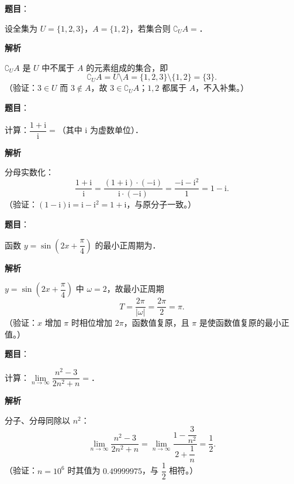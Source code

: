 \begin{answer}

\textbf{题目}：

设全集为 \(U=\{1,2,3\}\)，\(A=\{1,2\}\)，若集合则 \(\complement_{U}A=\)\gkblank{}．

\textbf{解析}

\(\complement_{U}A\) 是 \(U\) 中不属于 \(A\) 的元素组成的集合，即
\nopagebreak[4]
\[
\complement_{U}A=U\setminus A=\{1,2,3\}\setminus\{1,2\}=\{3\}.
\]
（验证：\(3\in U\) 而 \(3\notin A\)，故 \(3\in\complement_{U}A\)；\(1,2\) 都属于 \(A\)，不入补集。）


\end{answer}
\begin{answer}

\textbf{题目}：

计算：\(\dfrac{1+\mathrm{i}}{\mathrm{i}}=\)\gkblank{}（其中 \(\mathrm{i}\) 为虚数单位）．

\textbf{解析}

分母实数化：
\nopagebreak[4]
\[
\frac{1+\mathrm{i}}{\mathrm{i}}=\frac{(1+\mathrm{i})\cdot(-\mathrm{i})}{\mathrm{i}\cdot(-\mathrm{i})}=\frac{-\mathrm{i}-\mathrm{i}^{2}}{1}=1-\mathrm{i}.
\]
（验证：\((1-\mathrm{i})\mathrm{i}=\mathrm{i}-\mathrm{i}^{2}=1+\mathrm{i}\)，与原分子一致。）


\end{answer}
\begin{answer}

\textbf{题目}：

函数 \(y=\sin\left(2x+\dfrac{\pi}{4}\right)\) 的最小正周期为\gkblank{}．

\textbf{解析}

\(y=\sin\left(2x+\dfrac{\pi}{4}\right)\) 中 \(\omega=2\)，故最小正周期
\nopagebreak[4]
\[
T=\frac{2\pi}{|\omega|}=\frac{2\pi}{2}=\pi.
\]
（验证：\(x\) 增加 \(\pi\) 时相位增加 \(2\pi\)，函数值复原，且 \(\pi\) 是使函数值复原的最小正值。）


\end{answer}
\begin{answer}

\textbf{题目}：

计算：\(\lim\limits_{n\to\infty}\dfrac{n^{2}-3}{2n^{2}+n}=\)\gkblank{}．

\textbf{解析}

分子、分母同除以 \(n^{2}\)：
\nopagebreak[4]
\[
\lim_{n\to\infty}\frac{n^{2}-3}{2n^{2}+n}=\lim_{n\to\infty}\frac{1-\dfrac{3}{n^{2}}}{2+\dfrac{1}{n}}=\frac{1}{2}.
\]
（验证：\(n=10^{6}\) 时其值为 \(0.49999975\)，与 \(\dfrac{1}{2}\) 相符。）


\end{answer}
